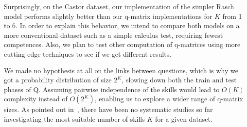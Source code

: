 \documentclass{sig-alternate}
\begin{document}


Surprisingly, on the Castor dataset, our implementation of the simpler Rasch model performs slightly better than our q-matrix implementations for $K$ from 1 to 6. In order to explain this behavior, we intend to compare both models on a more conventional dataset such as a simple calculus test, requiring fewest competences. Also, we plan to test other computation of q-matrices using more cutting-edge techniques to see if we get different results.




We made no hypothesis at all on the links between questions, which is why we got a probability distribution of size $2^K$, slowing down both the train and test phases of Q. Assuming pairwise independence of the skills would lead to $O(K)$ complexity instead of $O(2^K)$, enabling us to explore a wider range of q-matrix sizes. As pointed out in~\cite{Huebner2010}, there have been no systematic studies so far investigating the most suitable number of skills $K$ for a given dataset. %
\end{document}
